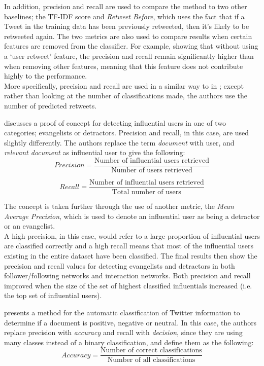 In addition, precision and recall are used to compare the method to two other baselines; the TF-IDF score and \emph{Retweet Before}, which uses the fact that if a Tweet in the training data has been previously retweeted, then it's likely to be retweeted again. The two metrics are also used to compare results when certain features are removed from the classifier. For example, showing that without using a `user retweet' feature,
the precision and recall remain significantly higher than when removing other features, meaning that this feature does not contribute highly to the performance. \\
More specifically, precision and recall are used in a similar way to in \cite{castillo11}; except rather than looking at the number of classifications made, the authors use the number of predicted retweets.

\cite{bigonha10} discusses a proof of concept for detecting influential users in one of two categories; evangelists or detractors. Precision and recall, in this case, are used slightly differently. The authors replace the term  \emph{document} with user, and  \emph{relevant document} as influential user to give the following:
\[	
	Precision = \frac{\text{Number of influential users retrieved}}{\text{Number of users retrieved}}
\]

\[
	Recall = \frac{\text{Number of influential users retrieved}}{\text{Total number of users}}
\]

The concept is taken further through the use of another metric, the \emph{Mean Average Precision}, which is used to denote an influential user as being a detractor or an evangelist. \\
A high precision, in this case, would refer to a large proportion of influential users are classified correctly and a high recall means that most of the influential users existing in the entire dataset have been classified. The final results then show the precision and recall values for detecting evangelists and detractors in both follower/following networks and interaction networks. Both precision and recall improved when the size of the set of highest classified influentials increased (i.e. the top set of influential users).

\cite{pak10} presents a method for the automatic classification of Twitter information to determine if a document is positive, negative or neutral. In this case, the authors replace precision with \emph{accuracy} and recall with \emph{decision}, since they are using many classes instead of a binary classification, and define them as the following:
\[	
	Accuracy = \frac{\text{Number of correct classifications}}{\text{Number of all classifications}}
\]

